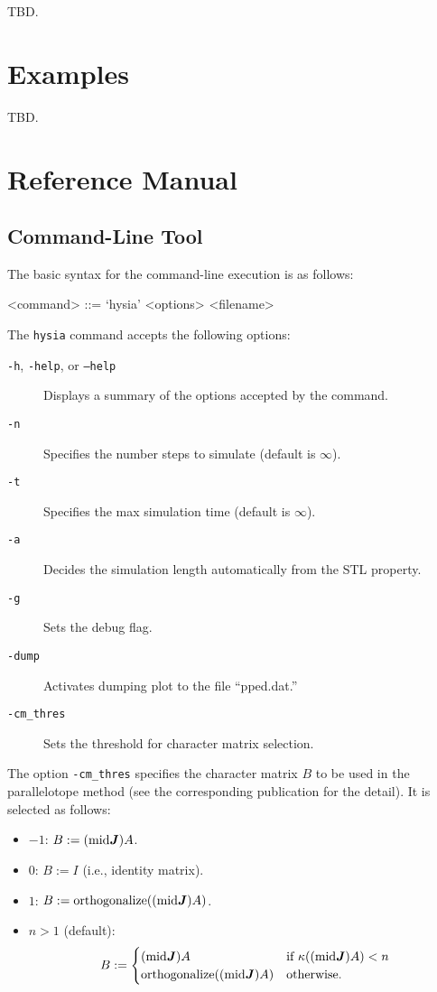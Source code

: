 \documentclass[10pt,a4paper]{article}
\begin{document}
TBD.


\section{Examples}

TBD.


\section{Reference Manual}

\subsection{Command-Line Tool}

The basic syntax for the command-line execution is as follows:
\begin{grammar}
<command> ::= `hysia' <options> <filename>
\end{grammar}
%
The \texttt{hysia} command accepts the following options:
\begin{description}
\item[\texttt{-h}, \texttt{-help}, or \texttt{--help}] Displays a summary of the options accepted by the command.
\item[\texttt{-n}] Specifies the number steps to simulate (default is $\infty$).
\item[\texttt{-t}] Specifies the max simulation time (default is $\infty$).
\item[\texttt{-a}] Decides the simulation length automatically from the STL property.
\item[\texttt{-g}] Sets the debug flag.
\item[\texttt{-dump}] Activates dumping plot to the file ``pped.dat.''
\item[\texttt{-cm_thres}] Sets the threshold for character matrix selection.
\end{description}

The option \texttt{-cm_thres} specifies the character matrix $B$ to be used in the parallelotope method (see the corresponding publication for the detail). It is selected as follows:
\begin{itemize}
	\item $-1$: $B := (\mathrm{mid}\J) A$.
	\item $0$: $B := I$ (i.e., identity matrix).
	\item $1$: $B := \mathrm{orthogonalize}((\mathrm{mid}\J) A)$.
	\item $n > 1$ (default): 
		\[
			B := \begin{cases}
				(\mathrm{mid}\J) A & \text{if $\kappa((\mathrm{mid}\J) A) < n$} \\
				\mathrm{orthogonalize}((\mathrm{mid}\J) A) & \text{otherwise.}
			\end{cases}
		\]
\end{itemize}
\end{document}
